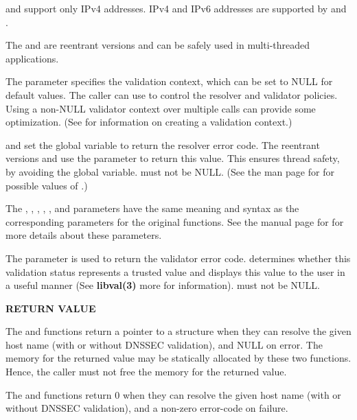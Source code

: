  and 
support only IPv4 addresses.  IPv4 and IPv6 addresses are supported by
 and .

The  and  are
reentrant versions and can be safely used in multi-threaded applications.

The  parameter specifies the validation context, which can be set to
NULL for default values.  The caller can use  to control the resolver
and validator policies.  Using a non-NULL validator context over multiple
calls can provide some optimization.  (See  for
information on creating a validation context.)

 and  set the global
 variable to return the resolver error code.  The reentrant
versions  and 
use the  parameter to return this value.  This ensures thread
safety, by avoiding the global  variable.   must
not be NULL.  (See the man page for  for possible
values of .)

The , , , , , and 
parameters have the same meaning and syntax as the corresponding parameters
for the original  functions.  See the manual page for
 for more details about these parameters.

The  parameter is used to return the validator error code.
 determines whether this validation status represents a
trusted value and  displays this value to the user in a
useful manner (See {\bf libval(3)} more for information).  
must not be NULL.

{\bf RETURN VALUE}

The  and  functions
return a pointer to a  structure when they can resolve the
given host name (with or without DNSSEC validation), and NULL on error.  The
memory for the returned value may be statically allocated by these two
functions.  Hence, the caller must not free the memory for the returned value.

The  and 
functions return 0 when they can resolve the given host name (with or
without DNSSEC validation), and a non-zero error-code on failure.

